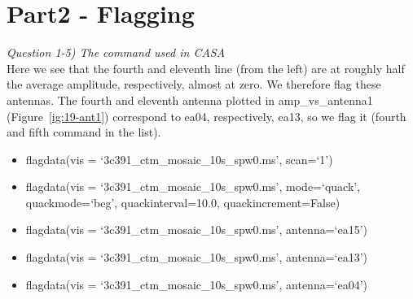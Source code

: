 \documentclass[12pt, a4paper]{article}
\begin{document}
\section{Part2 - Flagging}
\noindent \textit{Question 1-5) The command used in CASA} \\
Here we see that the fourth and eleventh line (from the left) are at roughly half the average amplitude, respectively, almost at zero. We therefore flag these antennas. The fourth and eleventh antenna plotted in amp\_vs\_antenna1 (Figure~\ref{ig:19-ant1}) correspond to ea04, respectively, ea13, so we flag it (fourth and fifth command in the list). \\
\begin{itemize}
    \item flagdata(vis = `3c391\_ctm\_mosaic\_10s\_spw0.ms', scan=`1')
    \item flagdata(vis = `3c391\_ctm\_mosaic\_10s\_spw0.ms', mode=`quack', quackmode=`beg', quackinterval=10.0, quackincrement=False)
    \item flagdata(vis = `3c391\_ctm\_mosaic\_10s\_spw0.ms', antenna=`ea15')
    \item flagdata(vis = `3c391\_ctm\_mosaic\_10s\_spw0.ms', antenna=`ea13')
    \item flagdata(vis = `3c391\_ctm\_mosaic\_10s\_spw0.ms', antenna=`ea04')
\end{itemize}
\end{document}
